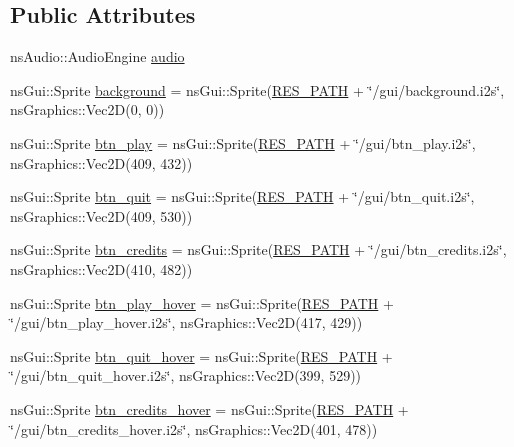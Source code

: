 \subsection*{Public Attributes}
\begin{DoxyCompactItemize}
\item 
ns\+Audio\+::\+Audio\+Engine \hyperlink{class_main_menu_state_ab3d896522cecaf5f804f2b433ff102f1}{audio}
\item 
ns\+Gui\+::\+Sprite \hyperlink{class_main_menu_state_a0cc76e15a2093e406857db39a65ea301}{background} = ns\+Gui\+::\+Sprite(\hyperlink{definitions_8h_a793644bd88146828177a2a4f57e3bf01}{R\+E\+S\+\_\+\+P\+A\+TH} + \char`\"{}/gui/background.\+i2s\char`\"{}, ns\+Graphics\+::\+Vec2D(0, 0))
\item 
ns\+Gui\+::\+Sprite \hyperlink{class_main_menu_state_a7de6cb44676e4d79205a1554dc93af5c}{btn\+\_\+play} = ns\+Gui\+::\+Sprite(\hyperlink{definitions_8h_a793644bd88146828177a2a4f57e3bf01}{R\+E\+S\+\_\+\+P\+A\+TH} + \char`\"{}/gui/btn\+\_\+play.\+i2s\char`\"{}, ns\+Graphics\+::\+Vec2D(409, 432))
\item 
ns\+Gui\+::\+Sprite \hyperlink{class_main_menu_state_a6aa9442fce374369cd9a04191f15b81e}{btn\+\_\+quit} = ns\+Gui\+::\+Sprite(\hyperlink{definitions_8h_a793644bd88146828177a2a4f57e3bf01}{R\+E\+S\+\_\+\+P\+A\+TH} + \char`\"{}/gui/btn\+\_\+quit.\+i2s\char`\"{}, ns\+Graphics\+::\+Vec2D(409, 530))
\item 
ns\+Gui\+::\+Sprite \hyperlink{class_main_menu_state_a185ced99223cda9bc631685a7d5fde89}{btn\+\_\+credits} = ns\+Gui\+::\+Sprite(\hyperlink{definitions_8h_a793644bd88146828177a2a4f57e3bf01}{R\+E\+S\+\_\+\+P\+A\+TH} + \char`\"{}/gui/btn\+\_\+credits.\+i2s\char`\"{}, ns\+Graphics\+::\+Vec2D(410, 482))
\item 
ns\+Gui\+::\+Sprite \hyperlink{class_main_menu_state_aade833b5a15f6bddd7d72e9f641a96ea}{btn\+\_\+play\+\_\+hover} = ns\+Gui\+::\+Sprite(\hyperlink{definitions_8h_a793644bd88146828177a2a4f57e3bf01}{R\+E\+S\+\_\+\+P\+A\+TH} + \char`\"{}/gui/btn\+\_\+play\+\_\+hover.\+i2s\char`\"{}, ns\+Graphics\+::\+Vec2D(417, 429))
\item 
ns\+Gui\+::\+Sprite \hyperlink{class_main_menu_state_a7a2831cfa00750af1328b09199cb21e8}{btn\+\_\+quit\+\_\+hover} = ns\+Gui\+::\+Sprite(\hyperlink{definitions_8h_a793644bd88146828177a2a4f57e3bf01}{R\+E\+S\+\_\+\+P\+A\+TH} + \char`\"{}/gui/btn\+\_\+quit\+\_\+hover.\+i2s\char`\"{}, ns\+Graphics\+::\+Vec2D(399, 529))
\item 
ns\+Gui\+::\+Sprite \hyperlink{class_main_menu_state_a4402cf66bc3af622d2b7c7a3e143d32a}{btn\+\_\+credits\+\_\+hover} = ns\+Gui\+::\+Sprite(\hyperlink{definitions_8h_a793644bd88146828177a2a4f57e3bf01}{R\+E\+S\+\_\+\+P\+A\+TH} + \char`\"{}/gui/btn\+\_\+credits\+\_\+hover.\+i2s\char`\"{}, ns\+Graphics\+::\+Vec2D(401, 478))

\end{DoxyCompactItemize}
